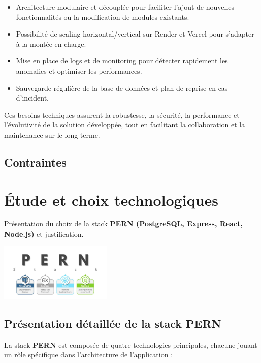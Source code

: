 \documentclass[12pt,a4paper]{report}
\begin{document}
\begin{itemize}
    \begin{itemize}
        \item Architecture modulaire et découplée pour faciliter l’ajout de nouvelles fonctionnalités ou la modification de modules existants.
        \item Possibilité de scaling horizontal/vertical sur Render et Vercel pour s’adapter à la montée en charge.
        \item Mise en place de logs et de monitoring pour détecter rapidement les anomalies et optimiser les performances.
        \item Sauvegarde régulière de la base de données et plan de reprise en cas d’incident.
    \end{itemize}
\end{itemize}

Ces besoins techniques assurent la robustesse, la sécurité, la performance et l’évolutivité de la solution développée, tout en facilitant la collaboration et la maintenance sur le long terme.

\section{Contraintes}

\chapter{Étude et choix technologiques}

Présentation du choix de la stack \textbf{PERN (PostgreSQL, Express, React, Node.js)} et justification.  

\begin{center}
    \includegraphics[width=0.4\textwidth]{1_ptqverAyBpdfUDhrs2g_3A.jpg} %
\end{center}

\section*{Présentation détaillée de la stack PERN}

La stack \textbf{PERN} est composée de quatre technologies principales, chacune jouant un rôle spécifique dans l’architecture de l’application :
\end{document}
